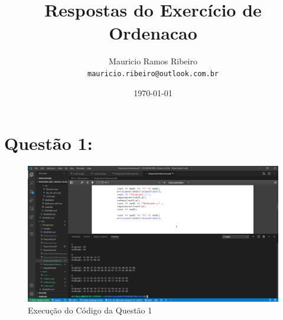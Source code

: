 \documentclass{article}
\author{
  Mauricio Ramos Ribeiro\\
  \texttt{mauricio.ribeiro@outlook.com.br}
}
\title{Respostas do Exercício de Ordenacao}
\date{\today}
\begin{document}
\maketitle

\vspace{15mm}


\section*{Questão 1:}

\begin{figure}[h!]
  \includegraphics[scale=0.5]{Extra01.png}
  \caption{Execução do Código da Questão 1}
\end{figure}

\vspace{15mm}
\end{document}
